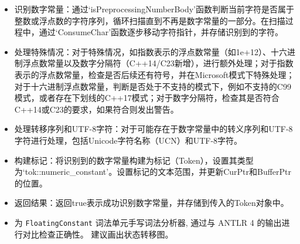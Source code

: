 \documentclass[a4paper, justified]{tufte-handout}
\begin{document}
\begin{solution}
\begin{itemize}
\begin{itemize}
        \item 识别数字常量：通过`isPreprocessingNumberBody'函数判断当前字符是否属于整数或浮点数的字符序列，循环扫描直到不再是数字常量的一部分。在扫描过程中，通过`ConsumeChar'函数逐步移动字符指针，并存储识别到的字符。
        \item 处理特殊情况：对于特殊情况，如指数表示的浮点数常量（如1e+12）、十六进制浮点数常量以及数字分隔符（C++14/C23新增），进行额外处理；对于指数表示的浮点数常量，检查是否后续还有符号，并在Microsoft模式下特殊处理；对于十六进制浮点数常量，判断是否处于不支持的模式下，例如不支持的C99模式，或者存在下划线的C++17模式；对于数字分隔符，检查其是否符合C++14或C23的要求，如果符合则发出警告。
        \item 处理转移序列和UTF-8字符：对于可能存在于数字常量中的转义序列和UTF-8字符进行处理，包括Unicode字符名称（UCN）和UTF-8字符。
        \item 构建标记：将识别到的数字常量构建为标记（Token），设置其类型为`tok::numeric\_constant'。设置标记的文本范围，并更新CurPtr和BufferPtr的位置。
        \item 返回结果：返回true表示成功识别数字常量，并存储到传入的Token对象中。
      \end{itemize}
  \end{itemize}
\end{solution}

\beginoptional
\begin{problem}[手写词法分析器]
  \begin{itemize}
    \item 为 \texttt{FloatingConstant} 词法单元手写词法分析器,
      通过与 ANTLR 4 的输出进行对比检查正确性。
      建议画出状态转移图。
  \end{itemize}
\end{problem}
\end{document}
